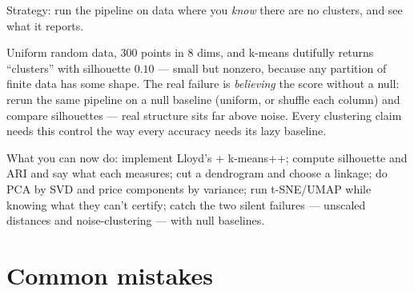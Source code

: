 



\begin{example}\label{ex:noise}
Strategy: run the pipeline on data where you \emph{know} there are no
clusters, and see what it reports.\par
\begin{solution}
Uniform random data, 300 points in 8 dims, and k-means dutifully returns
``clusters'' with silhouette $0.10$ --- small but nonzero, because any
partition of finite data has some shape. The real failure is
\emph{believing} the score without a null: rerun the same pipeline on a
null baseline (uniform, or shuffle each column) and compare silhouettes
--- real structure sits far above noise. Every clustering claim needs
this control the way every accuracy needs its lazy baseline.
\end{solution}
\end{example}

\begin{wins}
What you can now do: implement Lloyd's + k-means++; compute silhouette
and ARI and say what each measures; cut a dendrogram and choose a
linkage; do PCA by SVD and price components by variance; run t-SNE/UMAP
while knowing what they can't certify; catch the two silent failures ---
unscaled distances and noise-clustering --- with null baselines.
\end{wins}

\section{Common mistakes}


